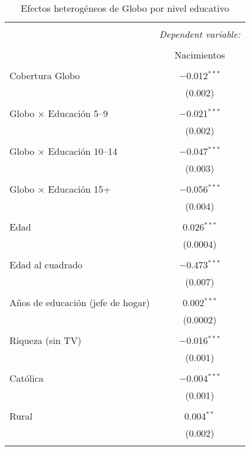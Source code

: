 
\begin{table}[!htbp] \centering 
  \caption{Efectos heterogéneos de Globo por nivel educativo} 
  \label{} 
\begin{tabular}{@{\extracolsep{5pt}}lc} 
\\[-1.8ex]\hline 
\hline \\[-1.8ex] 
 & \multicolumn{1}{c}{\textit{Dependent variable:}} \\ 
\cline{2-2} 
\\[-1.8ex] & Nacimientos \\ 
\hline \\[-1.8ex] 
 Cobertura Globo & $-$0.012$^{***}$ \\ 
  & (0.002) \\ 
  & \\ 
 Globo × Educación 5–9 & $-$0.021$^{***}$ \\ 
  & (0.002) \\ 
  & \\ 
 Globo × Educación 10–14 & $-$0.047$^{***}$ \\ 
  & (0.003) \\ 
  & \\ 
 Globo × Educación 15+ & $-$0.056$^{***}$ \\ 
  & (0.004) \\ 
  & \\ 
 Edad & 0.026$^{***}$ \\ 
  & (0.0004) \\ 
  & \\ 
 Edad al cuadrado & $-$0.473$^{***}$ \\ 
  & (0.007) \\ 
  & \\ 
 Años de educación (jefe de hogar) & 0.002$^{***}$ \\ 
  & (0.0002) \\ 
  & \\ 
 Riqueza (sin TV) & $-$0.016$^{***}$ \\ 
  & (0.001) \\ 
  & \\ 
 Católica & $-$0.004$^{***}$ \\ 
  & (0.001) \\ 
  & \\ 
 Rural & 0.004$^{**}$ \\ 
  & (0.002) \\ 
  & \\ 

\end{tabular}
\end{table}

